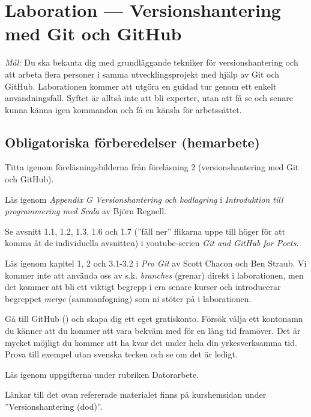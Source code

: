 \def\reponame{dod-lab2}

\section{Laboration  --- Versionshantering med Git och GitHub}

\emph{Mål:} Du ska bekanta dig med grundläggande tekniker för versionshantering och att arbeta flera personer i samma utvecklingsprojekt med hjälp av Git och GitHub. Laborationen kommer att utgöra en guidad tur genom ett enkelt användningsfall. Syftet är alltså inte att bli experter, utan att få se och senare kunna känna igen kommandon och få en känsla för arbetssättet.

\subsection*{Obligatoriska förberedelser (hemarbete)}
\begin{Hemarbete}\firmlist
	\item Titta igenom föreläsningsbilderna från föreläsning 2 (versionshantering med Git och GitHub).
	\item Läs igenom \emph{Appendix G Versionshantering och kodlagring} i \emph{Introduktion till programmering med Scala} av Björn Regnell.
	\item Se avsnitt 1.1, 1.2, 1.3, 1.6 och 1.7 (''fäll ner'' flikarna uppe till höger för att komma åt de individuella avsnitten) i youtube-serien \emph{Git and GitHub for Poets}.
	\item Läs igenom kapitel 1, 2 och 3.1-3.2 i \emph{Pro Git} av Scott Chacon och Ben Straub. Vi kommer inte att använda oss av s.k. \emph{branches} (grenar) direkt i laborationen, men det kommer att bli ett viktigt begrepp i era senare kurser och introducerar begreppet \emph{merge} (sammanfogning) som ni stöter på i laborationen.
	\item Gå till GitHub () och skapa dig ett eget gratiskonto. Försök välja ett kontonamn du känner att du kommer att vara bekväm med för en lång tid framöver. Det är mycket möjligt du kommer att ha kvar det under hela din yrkesverksamma tid. Prova till exempel  utan svenska tecken och se om det är ledigt.
	\item Läs igenom uppgifterna under rubriken Datorarbete.
\end{Hemarbete}
Länkar till det ovan refererade materialet finns på kurshemsidan under  ''Versionshantering (dod)''.

